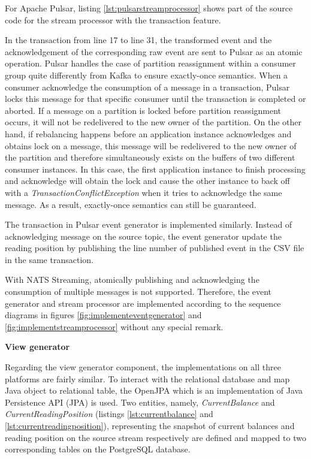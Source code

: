 For Apache Pulsar, listing \ref{lst:pulsarstreamprocessor} shows part of the source code for the stream processor with the transaction feature. 

 

In the transaction from line 17 to line 31, the transformed event and the acknowledgement of the corresponding raw event are sent to Pulsar as an atomic operation. Pulsar handles the case of partition reassignment within a consumer group quite differently from Kafka to ensure exactly-once semantics. When a consumer acknowledge the consumption of a message in a transaction, Pulsar locks this message for that specific consumer \cite{pulsartransaction} until the transaction is completed or aborted. If a message on a partition is locked before partition reassignment occurs, it will not be redelivered to the new owner of the partition. On the other hand, if rebalancing happens before an application instance acknowledges and obtains lock on a message, this message will be redelivered to the new owner of the partition and therefore simultaneously exists on the buffers of two different consumer instances. In this case, the first application instance to finish processing and acknowledge will obtain the lock and cause the other instance to back off with a \emph{TransactionConflictException} when it tries to acknowledge the same message. As a result, exactly-once semantics can still be guaranteed.

The transaction in Pulsar event generator is implemented similarly. Instead of acknowledging message on the source topic, the event generator update the reading position by publishing the line number of published event in the CSV file in the same transaction. 

With NATS Streaming, atomically publishing and acknowledging the consumption of multiple messages is not supported. Therefore, the event generator and stream processor are implemented according to the sequence diagrams in figures \ref{fig:implementeventgenerator} and \ref{fig:implementstreamprocessor} without any special remark.

\textbf{View generator}

Regarding the view generator component, the implementations on all three platforms are fairly similar. To interact with the relational database and map Java object to relational table, the OpenJPA which is an implementation of Java Persistence API (JPA) \cite{jpa} is used. Two entities, namely, \emph{CurrentBalance} and \emph{CurrentReadingPosition} (listings \ref{lst:currentbalance} and \ref{lst:currentreadingposition}), representing the snapshot of current balances and reading position on the source stream respectively are defined and mapped to two corresponding tables on the PostgreSQL database.   

